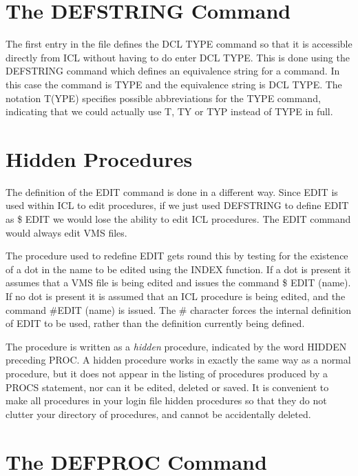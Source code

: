 \documentclass[twoside,11pt]{report}
\newcommand{\xlabel}[1]{}
\begin{document}
\section{\xlabel{the_defstring_command}The DEFSTRING Command}

The first entry in the file defines the DCL TYPE command so that it is
accessible directly from ICL without having to do enter DCL TYPE. This is
done using the DEFSTRING command which defines an equivalence string for
a command. In this case the command is TYPE and the equivalence string is
DCL TYPE. The notation T(YPE) specifies possible abbreviations for the
TYPE command, indicating that we could actually use T, TY or TYP instead
of TYPE in full.

\section{\xlabel{hidden_procedures}Hidden Procedures}

The definition of the EDIT command is done in a different way. Since EDIT
is used within ICL to edit procedures, if we just used DEFSTRING to define
EDIT as \$ EDIT we would lose the ability to edit ICL procedures. The EDIT
command would always edit VMS files.

The procedure used to redefine EDIT gets round this by testing for the
existence of a dot in the name to be edited using the INDEX function. If
a dot is present it assumes that a VMS file is being edited and issues the
command \$ EDIT (name). If no dot is present it is assumed that an ICL
procedure is being edited, and the command \#EDIT (name) is issued. The \#     
character forces the internal definition of EDIT to be used, rather than
the definition currently being defined.

The procedure is written as a {\em hidden} procedure, indicated by the word
HIDDEN preceding PROC. A hidden procedure works in exactly the same way
as a normal procedure, but it does not appear in the listing of procedures
produced by a PROCS statement, nor can it be edited, deleted or saved. It
is convenient to make all procedures in your login file hidden procedures
so that they do not clutter your directory of procedures, and cannot be
accidentally deleted.

\section{\xlabel{the_defproc_command}The DEFPROC Command}
\end{document}

